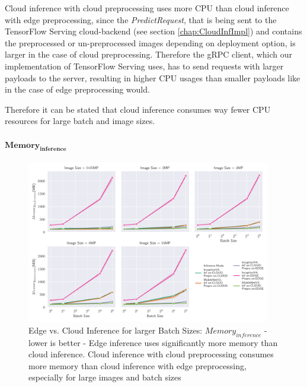 Cloud inference with cloud preprocessing uses more CPU than cloud inference with edge preprocessing, since the \emph{PredictRequest}, that is being sent to the TensorFlow Serving cloud-backend (see section \ref{chap:CloudInfImpl}) and contains the preprocessed or un-preprocessed images depending on deployment option, is larger in the case of cloud preprocessing.
Therefore the gRPC client, which our implementation of TensorFlow Serving uses, has to send requests with larger payloads to the server, resulting in higher CPU usages than smaller payloads like in the case of edge preprocessing would.


Therefore it can be stated that cloud inference consumes way fewer CPU resources for large batch and image sizes.



\paragraph{$\mathbf{Memory_{inference}}$}


\begin{figure}[!htb]
\centering
\includegraphics[width=0.95\textwidth]{./Bilder/single_plots/batch_size_plots/Effects_of_Batch_size_Inference_Memory.pdf}
\caption[Edge vs. Cloud Inference for larger Batch Sizes:  $Memory_{inference}$ - lower is better]{Edge vs. Cloud Inference for larger Batch Sizes:  $Memory_{inference}$ - lower is better - Edge inference uses significantly more memory than cloud inference. Cloud inference with cloud preprocessing consumes more memory than cloud inference with edge preprocessing, especially for large images and batch sizes}
\label{fig:BatchSizeInferenceMemory}
\end{figure}

